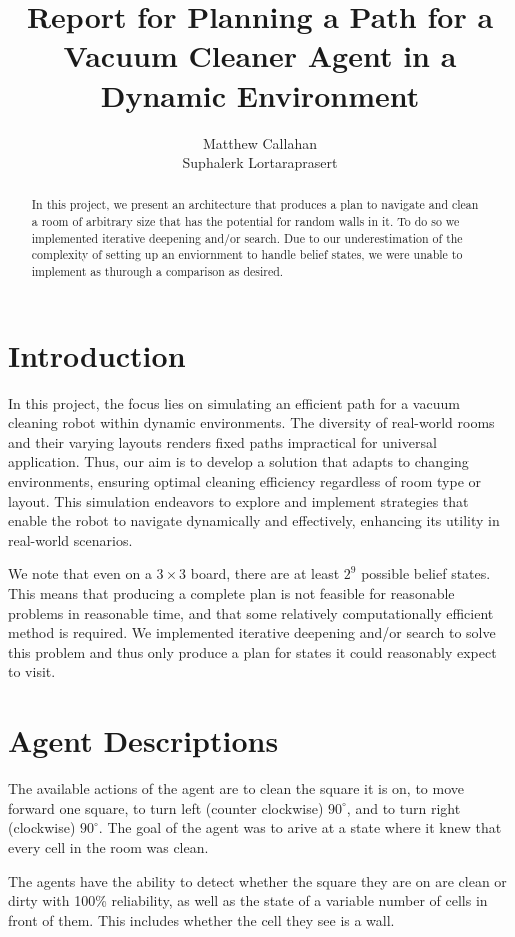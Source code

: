 \documentclass{article}
\title{Report for Planning a Path for a Vacuum Cleaner Agent in a Dynamic Environment}
\author{%
  Matthew Callahan\\
  \And
  Suphalerk Lortaraprasert
}
\begin{document}
\maketitle


\begin{abstract}
  In this project, we present an architecture that produces a plan to navigate and clean a room of arbitrary size that has the potential for random walls in it. To do so we implemented iterative deepening and/or search. Due to our underestimation of the complexity of setting up an enviornment to handle belief states, we were unable to implement as thurough a comparison as desired.

  
\end{abstract}

\section{Introduction}

In this project, the focus lies on simulating an efficient path for a vacuum cleaning robot within dynamic environments. The diversity of real-world rooms and their varying layouts renders fixed paths impractical for universal application. Thus, our aim is to develop a solution that adapts to changing environments, ensuring optimal cleaning efficiency regardless of room type or layout. This simulation endeavors to explore and implement strategies that enable the robot to navigate dynamically and effectively, enhancing its utility in real-world scenarios.

We note that even on a $3\times 3$ board, there are at least $2^9$ possible belief states. This means that producing a complete plan is not feasible for reasonable problems in reasonable time, and that some relatively computationally efficient method is required. We implemented iterative deepening and/or search to solve this problem and thus only produce a plan for states it could reasonably expect to visit.

\section{Agent Descriptions}
The available actions of the agent are to clean the square it is on, to move forward one square, to turn left (counter clockwise) $90^\circ$, and to turn right (clockwise) $90^\circ$. The goal of the agent was to arive at a state where it knew that every cell in the room was clean. 

The agents have the ability to detect whether the square they are on are clean or dirty with 100\% reliability, as well as the state of a variable number of cells in front of them. This includes whether the cell they see is a wall.
\end{document}
